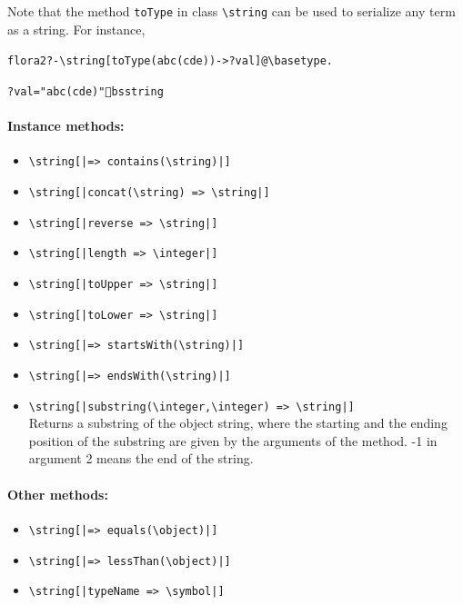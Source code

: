 \documentclass[11pt]{article}
\newcommand{\prompt}{flora2 ?- }
\newcommand{\bs}{\textbackslash}
\begin{document}
Note that the method {\tt toType} in class {\tt \bs{}string} can be used to
serialize any term as a string. For instance,
\begin{alltt}
   \prompt \bs{}string[toType(abc(cde))->?val]@\bs{}basetype.

   ?val = "abc(cde)"^^\bs{}string
\end{alltt}

\paragraph{Instance  methods:}
\begin{itemize}
\item {\tt \bs{}string[|=> contains(\bs{}string)|]}  
\item {\tt \bs{}string[|concat(\bs{}string) => \bs{}string|]}  
\item {\tt \bs{}string[|reverse => \bs{}string|]}  
\item {\tt \bs{}string[|length => \bs{}integer|]}  
\item {\tt \bs{}string[|toUpper => \bs{}string|]}  
\item {\tt \bs{}string[|toLower => \bs{}string|]}  
\item {\tt \bs{}string[|=> startsWith(\bs{}string)|]}  
\item {\tt \bs{}string[|=> endsWith(\bs{}string)|]}  
\item {\tt \bs{}string[|substring(\bs{}integer,\bs{}integer) => \bs{}string|]}  
  \\
  Returns a substring of the object string, where the starting and the
  ending position of the substring are given by the arguments of the
  method. -1 in argument 2 means the end of the string.
\end{itemize}

\paragraph{Other methods:}
\begin{itemize}
\item {\tt \bs{}string[|=> equals(\bs{}object)|]}  
\item {\tt \bs{}string[|=> lessThan(\bs{}object)|]}  
\item {\tt \bs{}string[|typeName => \bs{}symbol|]}  
\end{itemize}
\end{document}
